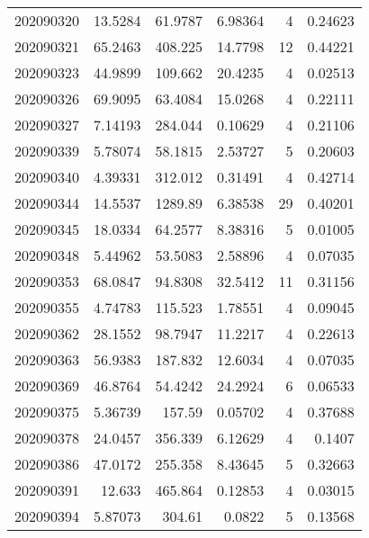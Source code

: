 \begin{tabular}{rrrrrr}
 202090320 &         13.5284  &       61.9787 &            6.98364 &           4 & 0.24623 \\
 202090321 &         65.2463  &      408.225  &           14.7798  &          12 & 0.44221 \\
 202090323 &         44.9899  &      109.662  &           20.4235  &           4 & 0.02513 \\
 202090326 &         69.9095  &       63.4084 &           15.0268  &           4 & 0.22111 \\
 202090327 &          7.14193 &      284.044  &            0.10629 &           4 & 0.21106 \\
 202090339 &          5.78074 &       58.1815 &            2.53727 &           5 & 0.20603 \\
 202090340 &          4.39331 &      312.012  &            0.31491 &           4 & 0.42714 \\
 202090344 &         14.5537  &     1289.89   &            6.38538 &          29 & 0.40201 \\
 202090345 &         18.0334  &       64.2577 &            8.38316 &           5 & 0.01005 \\
 202090348 &          5.44962 &       53.5083 &            2.58896 &           4 & 0.07035 \\
 202090353 &         68.0847  &       94.8308 &           32.5412  &          11 & 0.31156 \\
 202090355 &          4.74783 &      115.523  &            1.78551 &           4 & 0.09045 \\
 202090362 &         28.1552  &       98.7947 &           11.2217  &           4 & 0.22613 \\
 202090363 &         56.9383  &      187.832  &           12.6034  &           4 & 0.07035 \\
 202090369 &         46.8764  &       54.4242 &           24.2924  &           6 & 0.06533 \\
 202090375 &          5.36739 &      157.59   &            0.05702 &           4 & 0.37688 \\
 202090378 &         24.0457  &      356.339  &            6.12629 &           4 & 0.1407  \\
 202090386 &         47.0172  &      255.358  &            8.43645 &           5 & 0.32663 \\
 202090391 &         12.633   &      465.864  &            0.12853 &           4 & 0.03015 \\
 202090394 &          5.87073 &      304.61   &            0.0822  &           5 & 0.13568 \\

\end{tabular}
